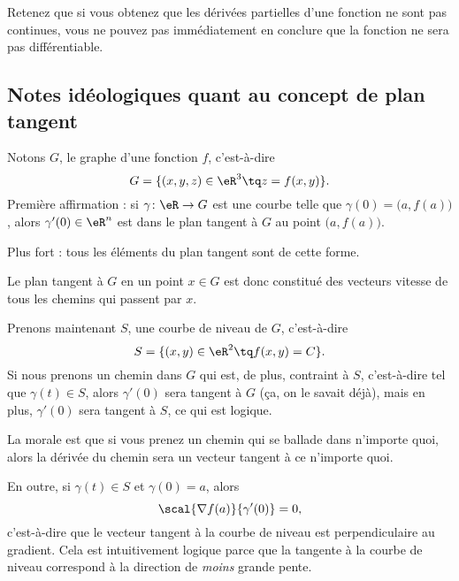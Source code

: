    Retenez que si vous obtenez que les dérivées partielles d'une fonction ne sont pas continues, vous ne pouvez pas immédiatement en conclure que la fonction ne sera pas différentiable.


\subsection{Notes idéologiques quant au concept de plan tangent}
\label{ssecConceptPlanTag}

Notons \( G\), le graphe d'une fonction \( f\), c'est-à-dire
\begin{equation}
	G=\{ (x,y,z)\in\eR^3\tq z=f(x,y) \}.
\end{equation}
Première affirmation : si \( \gamma\colon \eR\to G\) est une courbe telle que \( \gamma(0)=\big( a,f(a) \big)\), alors \( \gamma'(0)\in\eR^n\) est dans le plan tangent à \( G\) au point \( \big( a,f(a) \big)\).

Plus fort : tous les éléments du plan tangent sont de cette forme.

Le plan tangent à \( G\) en un point \( x\in G\) est donc constitué des vecteurs vitesse de tous les chemins qui passent par \( x\).

Prenons maintenant \( S\), une courbe de niveau de \( G\), c'est-à-dire
\begin{equation}
	S=\{ (x,y)\in\eR^2\tq f(x,y)=C \}.
\end{equation}
Si nous prenons un chemin dans \( G\) qui est, de plus, contraint à \( S\), c'est-à-dire tel que \( \gamma(t)\in S\), alors \( \gamma'(0)\) sera tangent à \( G\) (ça, on le savait déjà), mais en plus, \( \gamma'(0)\) sera tangent à \( S\), ce qui est logique.

La morale est que si vous prenez un chemin qui se ballade dans n'importe quoi, alors la dérivée du chemin sera un vecteur tangent à ce n'importe quoi.

En outre, si \( \gamma(t)\in S\) et \( \gamma(0)=a\), alors
\begin{equation}
	\scal{\nabla f(a)}{\gamma'(0)}=0,
\end{equation}
c'est-à-dire que le vecteur tangent à la courbe de niveau est perpendiculaire au gradient. Cela est intuitivement logique parce que la tangente à la courbe de niveau correspond à la direction de \emph{moins} grande pente.

